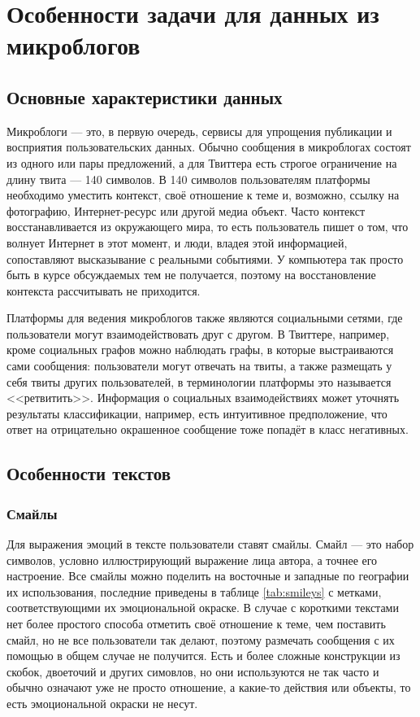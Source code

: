 \section{Особенности задачи для данных из микроблогов}
\subsection{Основные характеристики данных}
Микроблоги --- это, в первую очередь, сервисы для упрощения публикации и восприятия пользовательских
данных. Обычно сообщения в микроблогах состоят из одного или пары предложений, а для Твиттера есть
строгое ограничение на длину твита --- 140 символов. В 140 символов пользователям платформы необходимо
уместить контекст, своё отношение к теме и, возможно, ссылку на фотографию, Интернет-ресурс или
другой медиа объект. Часто контекст восстанавливается из окружающего мира, то есть пользователь
пишет о том, что волнует Интернет в этот момент, и люди, владея этой информацией, сопоставляют
высказывание с реальными событиями. У компьютера так просто быть в курсе обсуждаемых тем не
получается, поэтому на восстановление контекста рассчитывать не приходится.

Платформы для ведения микроблогов также являются социальными сетями, где пользователи могут
взаимодействовать друг с другом. В Твиттере, например, кроме социальных графов можно наблюдать
графы, в которые выстраиваются сами сообщения: пользователи могут отвечать на твиты, а также
размещать у себя твиты других пользователей, в терминологии платформы это называется
<<ретвитить>>. Информация о социальных взаимодействиях может уточнять результаты классификации,
например, есть интуитивное предположение, что ответ на отрицательно окрашенное сообщение тоже
попадёт в класс негативных.

\subsection{Особенности текстов}
\subsubsection{Смайлы}
Для выражения эмоций в тексте пользователи ставят смайлы. Смайл --- это набор символов, условно
иллюстрирующий выражение лица автора, а точнее его настроение. Все смайлы можно поделить на
восточные и западные по географии их использования, последние приведены в таблице \ref{tab:smileys}
с метками, соответствующими их эмоциональной окраске. В случае с короткими текстами нет более
простого способа отметить своё отношение к теме, чем поставить смайл, но не все пользователи так
делают, поэтому размечать сообщения с их помощью в общем случае не получится. Есть и более сложные
конструкции из скобок, двоеточий и других симовлов, но они используются не так часто и обычно
означают уже не просто отношение, а какие-то действия или объекты, то есть эмоциональной окраски не
несут.


